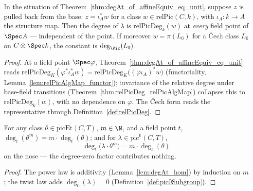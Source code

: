 \begin{theorem}
  \label{thm:degAt_baseChange}
  \leanok
  In the situation of Theorem~\ref{thm:degAt_of_affineEquiv_eq_unit}, suppose \(z\) is pulled
  back from the base: \(z = \iota_A^{*} w\) for a class \(w \in \mathrm{relPic}(C,k)\), with
  \(\iota_A \colon k \to A\) the structure map. Then the degree of \(\lambda\) is
  \(\mathrm{relPicDeg}_k(w)\) at \emph{every} field point of \(\Spec A\) — independent of the
  point. If moreover \(w = \pi(L_0)\) for a \v Cech class \(L_0\) on \(C \otimes \Spec k\),
  the constant is \(\deg_{\Pic}(L_0)\).
\end{theorem}
\begin{proof}
  \leanok
  At a field point \(\Spec\varphi\), Theorem~\ref{thm:degAt_of_affineEquiv_eq_unit} reads
  \(\mathrm{relPicDeg}_K(\varphi^{*}\iota_A^{*}w) =
  \mathrm{relPicDeg}_K\bigl((\varphi\iota_A)^{*}w\bigr)\) (functoriality,
  Lemma~\ref{lem:relPicAlgMap_functor}); invariance of the relative degree under base-field
  transitions (Theorem~\ref{thm:relPicDeg_relPicAlgMap}) collapses this to
  \(\mathrm{relPicDeg}_k(w)\), with no dependence on \(\varphi\). The \v Cech form reads the
  representative through Definition~\ref{def:relPicDeg}.
\end{proof}

\begin{theorem}
  \label{thm:degAt_pic0_mul_pow}
  \leanok
  For any class \(\theta \in \mathrm{picEt}(C,T)\), \(m \in \N\), and a field point \(t\),
  \(\deg_t(\theta^m) = m \cdot \deg_t(\theta)\); and for
  \(\lambda \in \mathrm{pic}^0(C,T)\),
  \[
    \deg_t\bigl(\lambda \cdot \theta^{m}\bigr) = m \cdot \deg_t(\theta)
  \]
  on the nose — the degree-zero factor contributes nothing.
\end{theorem}
\begin{proof}
  \leanok
  The power law is additivity (Lemma~\ref{lem:degAt_hom}) by induction on \(m\); the twist
  law adds \(\deg_t(\lambda) = 0\) (Definition~\ref{def:pic0Subgroup}).
\end{proof}

